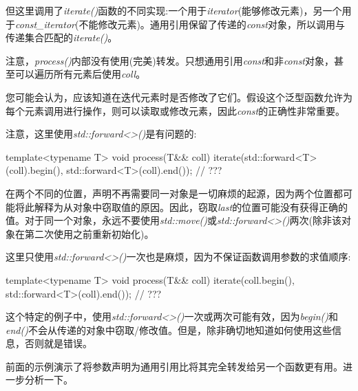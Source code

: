 但这里调用了\textit{iterate()}函数的不同实现:一个用于\textit{iterator}(能够修改元素)，另一个用于\textit{const\_\allowbreak{}iterator}(不能修改元素)。通用引用保留了传递的\textit{const}对象，所以调用与传递集合匹配的\textit{iterate()}。\par

注意，\textit{process()}内部没有使用(完美)转发。只想通用引用\textit{const}和非\textit{const}对象，甚至可以遍历所有元素后使用\textit{coll}。\par

您可能会认为，应该知道在迭代元素时是否修改了它们。假设这个泛型函数允许为每个元素调用进行操作，则可以读取或修改元素，因此\textit{const}的正确性非常重要。\par

注意，这里使用\textit{std::\allowbreak{}forward<\allowbreak{}>(\allowbreak{})\allowbreak{}}是有问题的:\par

\begin{codebox}[cpp]
template<typename T>
void process(T&& coll)
{
  iterate(std::forward<T>(coll).begin(), std::forward<T>(coll).end()); // ???
}
\end{codebox}

在两个不同的位置，声明不再需要同一对象是一切麻烦的起源，因为两个位置都可能将此解释为从对象中窃取值的原因。因此，窃取\textit{last}的位置可能没有获得正确的值。对于同一个对象，永远不要使用\textit{std::move()}或\textit{std::\allowbreak{}forward<\allowbreak{}>(\allowbreak{})\allowbreak{}}两次(除非该对象在第二次使用之前重新初始化)。\par

这里只使用\textit{std::\allowbreak{}forward<\allowbreak{}>(\allowbreak{})\allowbreak{}}一次也是麻烦，因为不保证函数调用参数的求值顺序:\par

\begin{codebox}[cpp]
  template<typename T>
  void process(T&& coll)
  {
    iterate(coll.begin(), std::forward<T>(coll).end()); // ???
  }
\end{codebox}

这个特定的例子中，使用\textit{std::\allowbreak{}forward<\allowbreak{}>(\allowbreak{})\allowbreak{}}一次或两次可能有效，因为\textit{begin()}和\textit{end()}不会从传递的对象中窃取/修改值。但是，除非确切地知道如何使用这些信息，否则就是错误。\par


前面的示例演示了将参数声明为通用引用比将其完全转发给另一个函数更有用。进一步分析一下。\par

